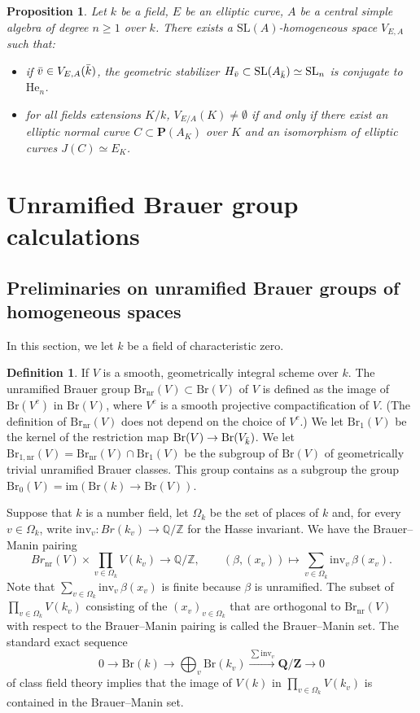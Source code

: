 \documentclass[10pt,letterpaper,twoside]{article}
\renewcommand{\1}{\mathbf{1}}
\newcommand{\bP}{\mathbf{P}}
\newcommand{\bQ}{\mathbf{Q}}
\newcommand{\bZ}{\mathbf{Z}}
\newcommand{\inv}{\mathrm{inv}}
\newcommand{\nr}{\mathrm{nr}}
\newcommand{\im}{\mathrm{im}}
\renewcommand{\geq}{\geqslant}
\newcommand{\Br}{\mathrm{Br}}
\theoremstyle{plain}
\newtheorem{proposition}[theorem]{Proposition}
\theoremstyle{plain}
\theoremstyle{definition}
\theoremstyle{named}
\theoremstyle{definition}
\newtheorem{definition}[theorem]{Definition}
\begin{document}
\begin{proposition}
    Let $k$ be a field, $E$ be an elliptic curve, $A$ be a central simple algebra of degree $n\geq 1$ over $k$. There exists a $\mathrm{SL}(A)$-homogeneous space $V_{E,A}$ such that:
    \begin{itemize}
    \item if $\Bar{v}\in V_{E,A}(\Bar{k})$, the geometric stabilizer $H_{\Bar{v}}\subset \mathrm{SL}(A_{\Bar{k}})\simeq \mathrm{SL}_n$ is conjugate to $\mathrm{He}_n$. 
    \item for all fields extensions $K/k$, $V_{E/A}(K)\neq\emptyset$ if and only if there exist an elliptic normal curve $C\subset \bP(A_K)$ over $K$ and an isomorphism of elliptic curves $J(C)\simeq E_K$.
    \end{itemize}
\end{proposition}




\section{Unramified Brauer group calculations}

\subsection{Preliminaries on unramified Brauer groups of homogeneous spaces}

In this section, we let $k$ be a field of characteristic zero.

\begin{definition}
    If $V$ is a smooth, geometrically integral scheme over $k$. The unramified Brauer group $\Br_{\nr}(V)\subset \Br(V)$ of $V$ is defined as the image of $\Br(V^c)$ in $\Br(V)$, where $V^c$ is a smooth projective compactification of $V$. (The definition of $\Br_{\nr}(V)$ does not depend on the choice of $V^c$.) We
    let $\Br_1(V)$ be the kernel of the restriction map $\Br(V)\to \Br(V_{\Bar{k}})$. We let $\Br_{1,\nr}(V)=\Br_\nr(V)\cap\Br_1(V)$ be the subgroup of $\Br(V)$ of geometrically trivial unramified Brauer classes. This group contains as a
    subgroup the group $\Br_0(V)=\im(\Br(k)\rightarrow\Br(V))$.
\end{definition}

Suppose that $k$ is a number field, let $\Omega_k$ be the set of places of $k$ and, for every $v \in \Omega_k$, write $\text{inv}_v: Br(k_v) \to \mathbb{Q}/\mathbb{Z}$ for the Hasse invariant. We have the Brauer--Manin pairing
\[
Br_\nr(V) \times \prod_{v \in \Omega_k} V(k_v) \to \mathbb{Q}/\mathbb{Z}, \qquad (\beta, (x_v)) \mapsto \sum_{v \in \Omega_k} \text{inv}_v \, \beta(x_v).
\]
Note that $\sum_{v \in \Omega_k} \text{inv}_v \, \beta(x_v)$ is finite because $\beta$ is
unramified. The subset of $\prod_{v \in \Omega_k} V(k_v)$ consisting of the $(x_v)_{v\in \Omega_k}$
that are orthogonal to $\Br_\nr(V)$ with respect to the Brauer--Manin pairing is called the
Brauer--Manin set. The standard exact sequence
$$0\rightarrow\Br(k)\rightarrow\bigoplus_v\Br(k_v)\xrightarrow{\sum\inv_v}\bQ/\bZ\rightarrow 0$$ of class field theory implies that the image of $V(k)$ in $\prod_{v \in \Omega_k} V(k_v)$ is contained in the Brauer--Manin set.
\end{document}
